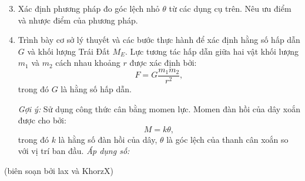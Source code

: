 \begin{enumerate}
\setcounter{enumi}{2}
\item Xác định phương pháp đo góc lệch nhỏ \(\theta\) từ các dụng cụ trên. Nêu ưu điểm và nhược điểm của phương pháp.

\item Trình bày cơ sở lý thuyết và các bước thực hành để xác định hằng số hấp dẫn \(G\) và khối lượng Trái Đất \(M_E\). Lực tương tác hấp dẫn giữa hai vật khối lượng \(m_1\) và \(m_2\) cách nhau khoảng \(r\) được xác định bởi:
\[
F = G \frac{m_1 m_2}{r^2},
\]
trong đó \(G\) là hằng số hấp dẫn.  

\emph{Gợi ý:} Sử dụng công thức cân bằng momen lực. Momen đàn hồi của dây xoắn được cho bởi:
\[
M = k \theta,
\]
trong đó \(k\) là hằng số đàn hồi của dây, \(\theta\) là góc lệch của thanh cân xoắn so với vị trí ban đầu.
\emph{Áp dụng số:}
\end{enumerate}

\begin{flushright}
    (biên soạn bởi lax và KhorzX)
\end{flushright}